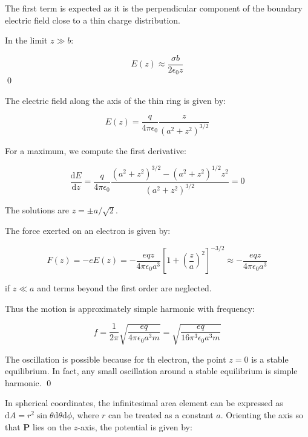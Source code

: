 \documentclass[12pt]{article}
\begin{document}
The first term is expected as it is the perpendicular component of the boundary electric field close to a thin charge distribution.

In the limit $z \gg b$:

\begin{equation}
    E(z) \approx \frac{\sigma b}{2\epsilon_{0}z}
\end{equation}
\qed



The electric field along the axis of the thin ring is given by:

\begin{equation}
    E(z) = \frac{q}{4\pi\epsilon_{0}} \frac{z}{(a^{2} + z^{2})^{3/2}}
\end{equation}

For a maximum, we compute the first derivative:

\begin{equation}
    \frac{\mathrm{d}E}{\mathrm{d}z} = \frac{q}{4\pi\epsilon_{0}} \frac{(a^{2} + z^{2})^{3/2} - (a^{2} + z^{2})^{1/2} z^{2}}{(a^{2} + z^{2})^{3/2}} = 0
\end{equation}

The solutions are $z = \pm a/\sqrt{2}$.

The force exerted on an electron is given by:

\begin{equation}
    F(z) = -e E(z) = -\frac{eqz}{4\pi\epsilon_{0} a^{3}} \left[ 1 + \left( \frac{z}{a} \right)^{2} \right]^{-3/2} \approx -\frac{eqz}{4\pi\epsilon_{0} a^{3}}
\end{equation}

if $z \ll a$ and terms beyond the first order are neglected.

Thus the motion is approximately simple harmonic with frequency:

\begin{equation}
    f = \frac{1}{2\pi} \sqrt{\frac{eq}{4\pi\epsilon_{0} a^{3} m}} = \sqrt{\frac{eq}{16\pi^{3} \epsilon_{0} a^{3} m}}
\end{equation}

The oscillation is possible because for th electron, the point $z = 0$ is a stable equilibrium. In fact, any small oscillation around a stable equilibrium is simple harmonic.
\qed


In spherical coordinates, the infinitesimal area element can be expressed as $\mathrm{d}A = r^{2} \sin{\theta} \mathrm{d}\theta \mathrm{d}\phi$, where $r$ can be treated as a constant $a$. Orienting the axis so that $\mathbf{P}$ lies on the $z$-axis, the potential is given by:
\end{document}
